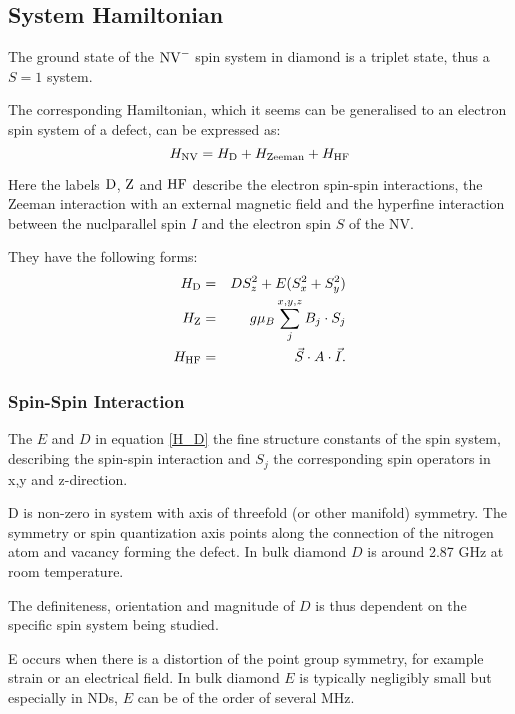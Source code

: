 \subsection{System Hamiltonian}\label{system_hamiltonian}
The ground state of the $\ce{NV^-}$ spin system in diamond is a triplet state, thus a $S=1$ system. 

The corresponding Hamiltonian, which it seems can be generalised to an electron spin system of a defect, can be expressed as: 
\begin{equation}
    H_{\ce{NV}} = H_{\ce{D}} + H_{\ce{Zeeman}} + H_{\ce{HF}} 
    \label{eq:nv_hamil}
\end{equation}

Here the labels $\ce{D}$, $\ce{Z}$ and $\ce{HF}$ describe the electron spin-spin interactions, the Zeeman interaction with an external magnetic field and the hyperfine interaction between the nuclparallel spin $I$ and the electron spin $S$ of the NV. 

They have the following forms: 
\begin{eqnarray}
    H_{\ce{D}} &=& D S_z^2 + E(S_x^2 + S_y^2) \label{H_D} \\
    H_{\ce{Z}} &=& g \mu_B \sum_{j}^{x,y,z} B_j \cdot S_j \label{H_Z} \\
    H_{\ce{HF}} &=& \vec{S} \cdot A \cdot \vec{I}. \label{H_HF}
\end{eqnarray}

\subsubsection{Spin-Spin Interaction}


The $E$ and $D$ in equation \ref{H_D} the fine structure constants of the spin
system, describing the spin-spin interaction and $S_j$ the corresponding spin operators
in x,y and z-direction. 

D is non-zero in system with axis of threefold (or other manifold) symmetry. 
The symmetry or spin quantization axis points along the connection of the nitrogen
atom and vacancy forming the defect. In bulk diamond $D$ is around 2.87 GHz at room temperature.

The definiteness, orientation and magnitude of $D$ is thus dependent on the specific spin system being studied. 

E occurs when there is a distortion of the point group symmetry, for example strain or an electrical field. In bulk diamond $E$ is typically negligibly small but especially in NDs, $E$ can be of the order of several MHz. 

